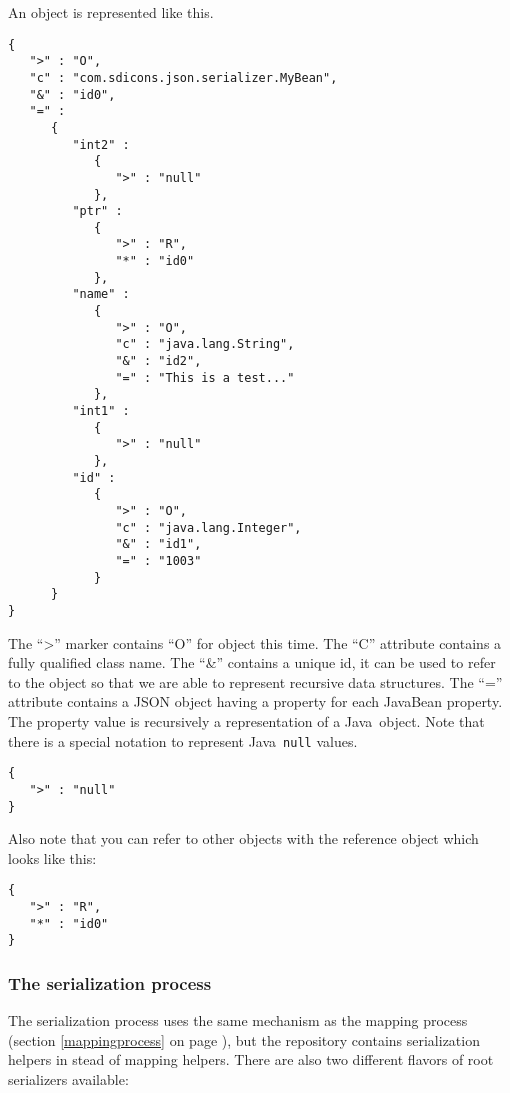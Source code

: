 \documentclass[a4paper]{article}
\newcommand{\java}{Java}
\begin{document}
An object is represented like this.

\medskip
\begin{lstlisting}
{
   ">" : "O",
   "c" : "com.sdicons.json.serializer.MyBean",
   "&" : "id0",
   "=" :
      {
         "int2" :
            {
               ">" : "null"
            },
         "ptr" :
            {
               ">" : "R",
               "*" : "id0"
            },
         "name" :
            {
               ">" : "O",
               "c" : "java.lang.String",
               "&" : "id2",
               "=" : "This is a test..."
            },
         "int1" :
            {
               ">" : "null"
            },
         "id" :
            {
               ">" : "O",
               "c" : "java.lang.Integer",
               "&" : "id1",
               "=" : "1003"
            }
      }
}
\end{lstlisting}
\medskip

The ``>'' marker contains ``O'' for object this time. The ``C'' attribute contains a fully qualified class name. The ``\&'' contains a unique id, it can be used to refer to the object so that we are able to represent recursive data structures. The ``=''  attribute contains a JSON object having a property for each JavaBean property.  The property value is recursively a representation of a \java\ object. Note that there is a special notation to represent \java\ \lstinline{null} values.

\medskip
\begin{lstlisting}
{
   ">" : "null"
}
\end{lstlisting}
\medskip

Also note that you can refer to other objects with the reference object which looks like this:

\medskip
\begin{lstlisting}
{
   ">" : "R",
   "*" : "id0"
}
\end{lstlisting}
\medskip

\subsubsection{The serialization process}
\label{serializationprocess}

The serialization process uses the same mechanism as the mapping process (section \ref{mappingprocess} on page \pageref{mappingprocess}), but the repository contains serialization helpers in stead of mapping helpers. There are also two different flavors of root serializers available:
\end{document}
